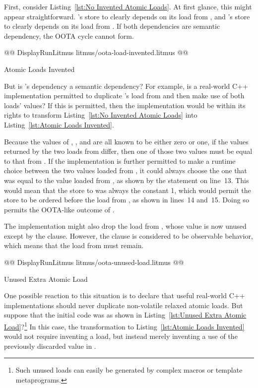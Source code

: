 \documentclass[10]{article}
\begin{document}
First, consider Listing~\ref{lst:No Invented Atomic Loads}.
At first glance, this might appear straightforward.
's store to  clearly depends on its load from ,
and 's store to  clearly depends on its load from .
If both dependencies are semantic dependency, the OOTA cycle cannot
form.

\begin{listing}[tbp]
@@ DisplayRunLitmus litmus/oota-load-invented.litmus @@
\caption{Atomic Loads Invented}
\label{lst:Atomic Loads Invented}
\end{listing}

But is 's dependency a semantic dependency?
For example, is a real-world C++ implementation permitted to
duplicate 's load from  and then make use of both loads'
values?
If this is permitted, then the implementation would be within its rights
to transform
Listing~\ref{lst:No Invented Atomic Loads}
into
Listing~\ref{lst:Atomic Loads Invented}.

Because the values of , , and  are all known to be
either zero or one, if the values returned by the two loads from 
differ, then one of those two values must be equal to that from .
If the implementation is further permitted to make a runtime choice
between the two values loaded from , it could always choose the
one that was equal to the value loaded from , as shown by the
 statement on line~13.
This would mean that the store to  was always the constant 1,
which would permit the store to be ordered before the load from ,
as shown in lines~14 and~15.
Doing so permits the OOTA-like outcome of .

The implementation might also drop the load from , whose value
is now unused except by the  clause.
However, the  clause is considered to be observable behavior,
which means that the load from  must remain.

\begin{listing}[tbp]
@@ DisplayRunLitmus litmus/oota-unused-load.litmus @@
\caption{Unused Extra Atomic Load}
\label{lst:Unused Extra Atomic Load}
\end{listing}

One possible reaction to this situation is to declare that useful
real-world C++ implementations should never duplicate non-volatile
relaxed atomic loads.
But suppose that the initial code was as shown in
Listing~\ref{lst:Unused Extra Atomic Load}?\footnote{
	Such unused loads can easily be generated by complex macros or
	template metaprograms.}
In this case, the transformation to
Listing~\ref{lst:Atomic Loads Invented}
would not require inventing a load, but instead merely inventing a use of
the previously discarded value in .
\end{document}
